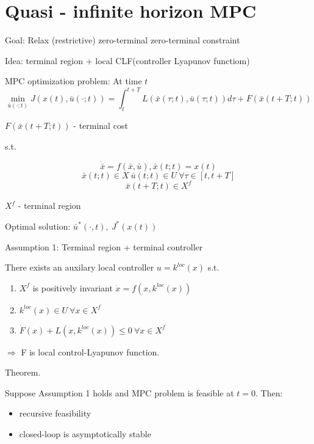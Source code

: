 \section{Quasi - infinite horizon MPC}

Goal: Relax (restrictive) zero-terminal zero-terminal constraint

Idea: terminal region + local CLF(controller Lyapunov functiom)

MPC optimization problem: At time $t$
\begin{equation*}
\min_{\bar u(\cdot;t)} J(x(t),\bar u(\cdot;t)) = \int_t^{t+T}L(\bar x(\tau;t), \bar u(\tau;t))d\tau + F(\bar x(t+T;t)) 
\end{equation*}

$F(\bar x(t+T;t))$ - terminal cost

s.t.

\begin{equation*}
\dot{\bar x} = f(\bar x, \bar u), \bar x(t;t) = x(t)
\end{equation*}
\begin{equation*}
\bar x(t;t) \in X \ \bar u(t;t) \in U \ \forall \tau \in [t,t+T]
\end{equation*}
\begin{equation*}
\bar x(t+T;t) \in X^f
\end{equation*}

$X^f$ - terminal region

Optimal solution: $\bar u^*(\cdot, t), \ J^*(x(t))$

Assumption 1: Terminal region + terminal controller

There exists an auxilary local controller $u = k^{loc}(x)$ s.t.
\begin{enumerate}
\item $X^f$ is positively invariant $\dot x = f(x,k^{loc}(x))$
\item $k^{loc}(x) \in U \ \forall x \in X^f$
\item $\dot F(x) + L(x, k^{loc}(x)) \leq 0 \ \forall x \in X^f$
\end{enumerate}

$\Rightarrow$ F is local control-Lyapunov function.

Theorem.

Suppose Assumption 1 holds and MPC problem is feasible at $t=0$. Then:
\begin{itemize}
\item recursive feasibility
\item closed-loop is asymptotically stable
\end{itemize}

